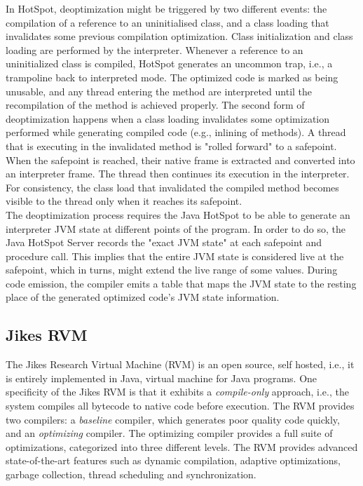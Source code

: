 In HotSpot, deoptimization might be triggered by two different events: the compilation of a reference to an uninitialised class, and a class loading that invalidates some previous compilation optimization.
Class initialization and class loading are performed by the interpreter. 
Whenever a reference to an uninitialized class is compiled, HotSpot generates an uncommon trap, i.e., a trampoline back to interpreted mode. 
The optimized code is  marked as being unusable, and any thread entering the method are interpreted until the recompilation of the method is achieved properly. 
The second form of deoptimization happens when a class loading invalidates some optimization performed while generating compiled code (e.g., inlining of methods).
A thread that is executing in the invalidated method is "rolled forward"\cite{paleczny2001java} to a safepoint.
When the safepoint is reached, their native frame is extracted and converted into an interpreter frame.
The thread then continues its execution in the interpreter. 
For consistency, the class load that invalidated the compiled method becomes visible to the thread only when it reaches its safepoint.\\

The deoptimization process requires the Java HotSpot to be able to generate an interpreter JVM state at different points of the program.
In order to do so, the Java HotSpot Server records the "exact JVM state"\cite{paleczny2001java} at each safepoint and procedure call.
This implies that the entire JVM state is considered live at the safepoint, which in turns, might extend the live range of some values.
During code emission, the compiler emits a table that maps the JVM state to the resting place of the generated optimized code's JVM state information.\\

\subsection{Jikes RVM}

The Jikes Research Virtual Machine (RVM)\cite{JikesRVMURL} is an open source, self hosted, i.e., it is entirely implemented in Java, virtual machine for Java programs.
One specificity of the Jikes RVM is that it exhibits a \textit{compile-only} approach, i.e., the system compiles all bytecode to native code before execution.
The RVM provides two compilers: a \textit{baseline} compiler, which generates poor quality code quickly, and an \textit{optimizing} compiler. 
The optimizing compiler provides a full suite of optimizations, categorized into three different levels.
The RVM provides advanced state-of-the-art features such as dynamic compilation, adaptive optimizations, garbage collection, thread scheduling and synchronization\cite{JikesRVMURL}.\\

